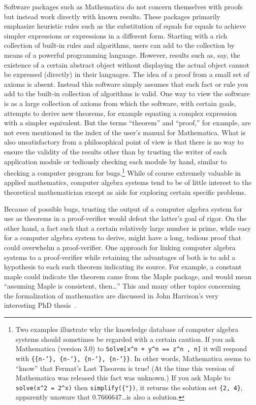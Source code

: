 Software packages such as Mathematica \cite{Wolfram} do not
concern themselves with proofs but instead work directly with known results.
These packages primarily emphasize heuristic rules such as the substitution of
equals for equals to achieve simpler expressions or expressions in a different
form.  Starting with a rich collection of built-in rules and algorithms, users
can add to the collection by means of a powerful programming language.
However, results such as, say, the existence of a certain abstract object
without displaying the actual object cannot be expressed (directly) in their
languages.  The idea of a proof from a small set of axioms is absent.  Instead
this software simply assumes that each fact or rule you add to the built-in
collection of algorithms is valid.  One way to view the software is as a large
collection of axioms from which the software, with certain goals, attempts to
derive new theorems, for example equating a complex expression with a simpler
equivalent. But the terms ``theorem'' and
``proof,'' for example, are not even mentioned in the index of
the user's manual for Mathematica.  What is also
unsatisfactory from a philosophical point of view is that there is no way to
ensure the validity of the results other than by trusting the writer of each
application module or tediously checking each module by hand, similar to
checking a computer program for bugs.\footnote{Two examples illustrate why the knowledge database of computer
algebra systems should sometimes be regarded with a certain caution.  If you
ask Mathematica (version 3.0) to \texttt{Solve[x\^{ }n + y\^{ }n == z\^{ }n , n]}
it will respond with \texttt{\{\{n-\char`\}, \{n-\char`\},
\{n-\char`\}, \{n-\char`\}\}}. In other words, Mathematica seems to
``know'' that Fermat's Last Theorem is true!  (At
the time this version of Mathematica was released this fact was unknown.)  If
you ask Maple to \texttt{solve(x\^{ }2 = 2\^{ }x)} then
\texttt{simplify(\{"\})}, it returns the solution set \texttt{\{2, 4\}}, apparently
unaware that 0.7666647\ldots is also a solution.} While of course extremely
valuable in applied mathematics, computer algebra systems tend to be of little
interest to the theoretical mathematician except as aids for exploring certain
specific problems.

Because of possible bugs, trusting the output of a computer algebra system for
use as theorems in a proof-verifier would defeat the latter's goal of rigor.
On the other hand, a fact such that a certain relatively large number is
prime, while easy for a computer algebra system to derive, might have a long,
tedious proof that could overwhelm a proof-verifier. One approach for linking
computer algebra systems to a proof-verifier while retaining the advantages of
both is to add a hypothesis to each such theorem indicating its source.  For
example, a constant {\sc maple} could indicate the theorem came from the Maple
package, and would mean ``assuming Maple is consistent, then\ldots''  This and
many other topics concerning the formalization of mathematics are discussed in
John Harrison's very interesting
PhD thesis~\cite{Harrison-thesis}.

